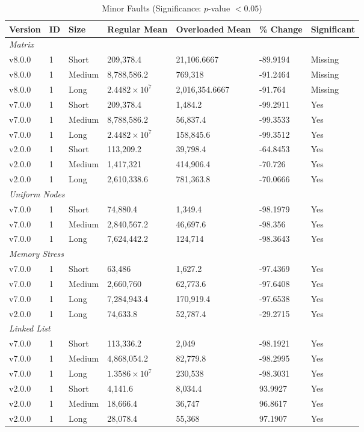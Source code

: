 \begin{table}[H]\caption{Minor Faults (Significance: $p$-value $<0.05$)}
\centering\footnotesize\setlength{\tabcolsep}{4pt}\renewcommand{\arraystretch}{1.15}
\begin{tabular}{lllllll}
\toprule
Version & ID & Size & Regular Mean & Overloaded Mean & \% Change & Significant \\ \midrule
\multicolumn{7}{l}{\textit{Matrix}} \\
v8.0.0 & 1 & Short & 209,378.4 & 21,106.6667 & -89.9194 & Missing \\
v8.0.0 & 1 & Medium & 8,788,586.2 & 769,318 & -91.2464 & Missing \\
v8.0.0 & 1 & Long & $2.4482\times10^{7}$ & 2,016,354.6667 & -91.764 & Missing \\
v7.0.0 & 1 & Short & 209,378.4 & 1,484.2 & -99.2911 & Yes \\
v7.0.0 & 1 & Medium & 8,788,586.2 & 56,837.4 & -99.3533 & Yes \\
v7.0.0 & 1 & Long & $2.4482\times10^{7}$ & 158,845.6 & -99.3512 & Yes \\
v2.0.0 & 1 & Short & 113,209.2 & 39,798.4 & -64.8453 & Yes \\
v2.0.0 & 1 & Medium & 1,417,321 & 414,906.4 & -70.726 & Yes \\
v2.0.0 & 1 & Long & 2,610,338.6 & 781,363.8 & -70.0666 & Yes \\
\multicolumn{7}{l}{\textit{Uniform Nodes}} \\
v7.0.0 & 1 & Short & 74,880.4 & 1,349.4 & -98.1979 & Yes \\
v7.0.0 & 1 & Medium & 2,840,567.2 & 46,697.6 & -98.356 & Yes \\
v7.0.0 & 1 & Long & 7,624,442.2 & 124,714 & -98.3643 & Yes \\
\multicolumn{7}{l}{\textit{Memory Stress}} \\
v7.0.0 & 1 & Short & 63,486 & 1,627.2 & -97.4369 & Yes \\
v7.0.0 & 1 & Medium & 2,660,760 & 62,773.6 & -97.6408 & Yes \\
v7.0.0 & 1 & Long & 7,284,943.4 & 170,919.4 & -97.6538 & Yes \\
v2.0.0 & 1 & Long & 74,633.8 & 52,787.4 & -29.2715 & Yes \\
\multicolumn{7}{l}{\textit{Linked List}} \\
v7.0.0 & 1 & Short & 113,336.2 & 2,049 & -98.1921 & Yes \\
v7.0.0 & 1 & Medium & 4,868,054.2 & 82,779.8 & -98.2995 & Yes \\
v7.0.0 & 1 & Long & $1.3586\times10^{7}$ & 230,538 & -98.3031 & Yes \\
v2.0.0 & 1 & Short & 4,141.6 & 8,034.4 & 93.9927 & Yes \\
v2.0.0 & 1 & Medium & 18,666.4 & 36,747 & 96.8617 & Yes \\
v2.0.0 & 1 & Long & 28,078.4 & 55,368 & 97.1907 & Yes \\
\bottomrule\end{tabular}
\label{MinorFaultsMetrics}
\par\smallskip\parbox{0.95\textwidth}{\scriptsize}
\end{table}

